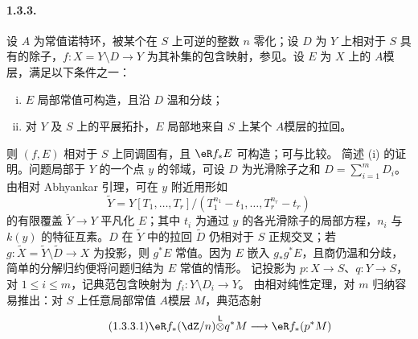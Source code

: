 \paragraph*{1.3.3.}
设 $A$ 为常值诺特环，被某个在 $S$ 上可逆的整数 $n$ 零化；设 $D$ 为 $Y$ 上相对于 $S$ 具有的除子，$f:X=Y\setminus D\to Y$ 为其补集的包含映射，参见\cite[XIII 2.1]{sga1}。设 $E$ 为 $X$ 上的 $A$模层，满足以下条件之一：
\begin{enumerate}[(i)]
\item $E$ 局部常值可构造，且沿 $D$ 温和分歧；
\item 对 $Y$ 及 $S$ 上的平展拓扑，$E$ 局部地来自 $S$ 上某个 $A$模层的拉回。
\end{enumerate}
则 $(f,E)$ 相对于 $S$ 上同调固有，且 $\eR f_\ast E$ 可构造；可与\cite[XIII 2.4]{sga1}比较。
简述 (i) 的证明。问题局部于 $Y$ 的一个点 $y$ 的邻域，可设 $D$ 为光滑除子之和 $D=\sum_{i=1}^mD_i$。由相对 Abhyankar 引理\cite[XIII 5.5]{sga1}，可在 $y$ 附近用形如
\[
 \widetilde Y=Y[T_1,\dots,T_r]/(T_1^{n_1}-t_1,\dots,T_r^{n_r}-t_r)
\]
的有限覆盖 $\widetilde Y\to Y$ 平凡化 $E$；其中 $t_i$ 为通过 $y$ 的各光滑除子的局部方程，$n_i$ 与 $k(y)$ 的特征互素。$D$ 在 $\widetilde Y$ 中的拉回 $\widetilde D$ 仍相对于 $S$ 正规交叉；若 $g:\widetilde X=\widetilde Y\setminus\widetilde D\to X$ 为投影，则 $g^\ast E$ 常值。因为 $E$ 嵌入 $g_\ast g^\ast E$，且商仍温和分歧，简单的分解归约便将问题归结为 $E$ 常值的情形。
记投影为 $p:X\to S$、$q:Y\to S$，对 $1\leqslant i\leqslant m$，记典范包含映射为 $f_i:Y\setminus D_i\to Y$。
由相对纯性定理\cite[XVI 3.7]{sga4}，对 $m$ 归纳容易推出：对 $S$ 上任意局部常值 $A$模层 $M$，典范态射
\begin{equation*}\tag{1.3.3.1}\label{VII:eq:5-1-3-3-1}
 \eR f_\ast(\dZ/n)\lotimes q^\ast M\longrightarrow\eR f_\ast(p^\ast M)
\end{equation*}

